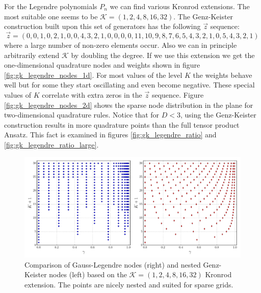 \documentclass[a4paper,10pt]{article}
\begin{document}
For the Legendre polynomials $P_n$ we can find various Kronrod extensions. The
most suitable one seems to be $\mathcal{K} = (1,2,4,8,16,32)$. The Genz-Keister
construction built upon this set of generators has the following $\vec{z}$
sequence:
\begin{equation*}
  \vec{z} = (0, 0, 1, 0, 2, 1, 0, 0, 4, 3, 2, 1, 0, 0, 0, 0, 11, 10, 9, 8, 7, 6, 5, 4, 3, 2, 1, 0, 5, 4, 3, 2, 1)
\end{equation*}
where a large number of non-zero elements occur. Also we can in principle
arbitrarily extend $\mathcal{K}$ by doubling the degree. If we use this
extension we get the one-dimensional quadrature nodes and weights shown
in figure \ref{fig:gk_legendre_nodes_1d}. For most values of the level $K$
the weights behave well but for some they start oscillating and even become
negative. These special values of $K$ correlate with extra zeros in the
$\vec{z}$ sequence. Figure \ref{fig:gk_legendre_nodes_2d} shows the sparse
node distribution in the plane for two-dimensional quadrature rules.
Notice that for $D < 3$, using the Genz-Keister construction results
in more quadrature points than the full tensor product Ansatz. This
fact is examined in figures \ref{fig:gk_legendre_ratio} and \ref{fig:gk_legendre_ratio_large}.

\begin{figure}[h]
  \centering
  \includegraphics[width=\linewidth]{./img/gk_legendre_nodes_cmp.pdf}
  \caption{Comparison of Gauss-Legendre nodes (right) and nested Genz-Keister nodes (left)
  based on the $\mathcal{K} = (1,2,4,8,16,32)$ Kronrod extension. The points are
  nicely nested and suited for sparse grids.}
  \label{fig:gk_legendre_nodes_cmp}
\end{figure}
\end{document}
